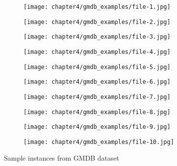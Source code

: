 \documentclass[../report.tex]{subfiles}
\begin{document}
	    \begin{figure}[H]
		\centering
		\begin{subfigure}[b]{0.17\textwidth}
			\centering
			\texttt{[image: chapter4/gmdb\_examples/file-1.jpg]}
		\end{subfigure}
		\begin{subfigure}[b]{0.17\textwidth}
			\centering
			\texttt{[image: chapter4/gmdb\_examples/file-2.jpg]}
		\end{subfigure}
		\begin{subfigure}[b]{0.17\textwidth}
			\centering
			\texttt{[image: chapter4/gmdb\_examples/file-3.jpg]}
		\end{subfigure}
		\begin{subfigure}[b]{0.17\textwidth}
			\centering
			\texttt{[image: chapter4/gmdb\_examples/file-4.jpg]}
		\end{subfigure}
		\begin{subfigure}[b]{0.17\textwidth}
			\centering
			\texttt{[image: chapter4/gmdb\_examples/file-5.jpg]}
		\end{subfigure}
			\begin{subfigure}[b]{0.17\textwidth}
		\centering
		\texttt{[image: chapter4/gmdb\_examples/file-6.jpg]}
		\end{subfigure}
		\begin{subfigure}[b]{0.17\textwidth}
		\centering
		\texttt{[image: chapter4/gmdb\_examples/file-7.jpg]}
		\end{subfigure}
		\begin{subfigure}[b]{0.17\textwidth}
		\centering
		\texttt{[image: chapter4/gmdb\_examples/file-8.jpg]}
		\end{subfigure}
		\begin{subfigure}[b]{0.17\textwidth}
		\centering
		\texttt{[image: chapter4/gmdb\_examples/file-9.jpg]}
		\end{subfigure}
		\begin{subfigure}[b]{0.17\textwidth}
		\centering
		\texttt{[image: chapter4/gmdb\_examples/file-10.jpg]}
		\end{subfigure}
		\caption{Sample instances from GMDB dataset}
		\label{fig_gmdb_examples}
		\end{figure}
\end{document}
